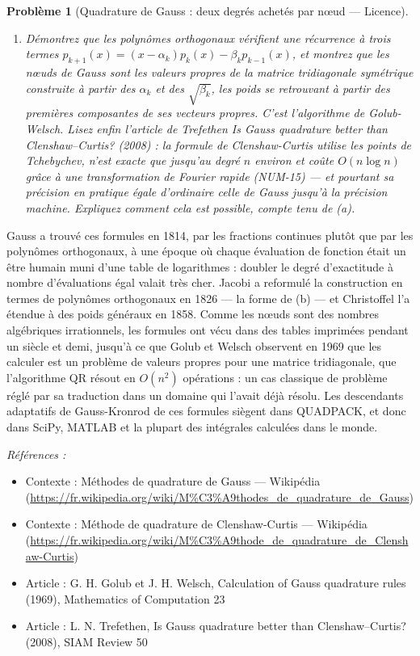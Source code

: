 \documentclass[11pt]{article}
\newtheorem{problem}{Problème}
\newenvironment{refs}{\par\small\noindent\emph{Références :}\begin{itemize}\setlength\itemsep{0pt}}{\end{itemize}\normalsize}
\begin{document}
\begin{problem}[{Quadrature de Gauss : deux degrés achetés par n\oe{}ud --- Licence}]
\begin{enumerate}
\item[(e)] Démontrez que les polynômes orthogonaux vérifient une récurrence à trois termes $p_{k+1}(x) = (x - \alpha_k)p_k(x) - \beta_k p_{k-1}(x)$, et montrez que les n\oe{}uds de Gauss sont les valeurs propres de la matrice tridiagonale symétrique construite à partir des $\alpha_k$ et des $\sqrt{\beta_k}$, les poids se retrouvant à partir des premières composantes de ses vecteurs propres. C'est l'algorithme de Golub-Welsch. Lisez enfin l'article de Trefethen \og{} Is Gauss quadrature better than Clenshaw--Curtis? \fg{} (2008) : la formule de Clenshaw-Curtis utilise les points de Tchebychev, n'est exacte que jusqu'au degré $n$ environ et coûte $O(n\log n)$ grâce à une transformation de Fourier rapide (NUM-15) --- et pourtant sa précision en pratique égale d'ordinaire celle de Gauss jusqu'à la précision machine. Expliquez comment cela est possible, compte tenu de (a).
\end{enumerate}

\end{problem}

\noindent Gauss a trouvé ces formules en 1814, par les fractions continues plutôt que par les polynômes orthogonaux, à une époque où chaque évaluation de fonction était un être humain muni d'une table de logarithmes : doubler le degré d'exactitude à nombre d'évaluations égal valait très cher. Jacobi a reformulé la construction en termes de polynômes orthogonaux en 1826 --- la forme de (b) --- et Christoffel l'a étendue à des poids généraux en 1858. Comme les n\oe{}uds sont des nombres algébriques irrationnels, les formules ont vécu dans des tables imprimées pendant un siècle et demi, jusqu'à ce que Golub et Welsch observent en 1969 que les calculer est un problème de valeurs propres pour une matrice tridiagonale, que l'algorithme QR résout en $O(n^2)$ opérations : un cas classique de problème réglé par sa traduction dans un domaine qui l'avait déjà résolu. Les descendants adaptatifs de Gauss-Kronrod de ces formules siègent dans QUADPACK, et donc dans SciPy, MATLAB et la plupart des intégrales calculées dans le monde.

\begin{refs}
\item Contexte : Méthodes de quadrature de Gauss --- Wikipédia (\url{https://fr.wikipedia.org/wiki/M%C3%A9thodes_de_quadrature_de_Gauss})
\item Contexte : Méthode de quadrature de Clenshaw-Curtis --- Wikipédia (\url{https://fr.wikipedia.org/wiki/M%C3%A9thode_de_quadrature_de_Clenshaw-Curtis})
\item Article : G. H. Golub et J. H. Welsch, \og{} Calculation of Gauss quadrature rules \fg{} (1969), Mathematics of Computation 23
\item Article : L. N. Trefethen, \og{} Is Gauss quadrature better than Clenshaw--Curtis? \fg{} (2008), SIAM Review 50
\end{refs}
\end{document}
